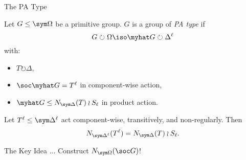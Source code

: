 \begin{frame}{The PA Type}
    \begin{defn}
        Let $G \leq \sym \Omega$ be a primitive group.
        $G$ is a group of \emph{PA type} if
        \\[-0.5em]
        \pause
        \[
        G \circlearrowright \Omega
        \iso
        \myhat G \circlearrowright \Delta ^
        \ell
        \]
        with:
        \vspace{-0.5em}
        \pause
        \begin{itemize}
            \item
            $T \circlearrowright \Delta$,
            \pause
            \item
            $\soc \myhat G = T ^ \ell$ in component-wise action,
            \pause
            \item
            $\myhat G \leq N_{\sym \Delta}(T) \wr S_\ell$ in product action.
        \end{itemize}
    \end{defn}
    \pause

    \begin{lemma}
        Let $T ^ \ell \leq \sym \Delta ^ \ell$ act component-wise,
        transitively, and non-regularly. Then
        \\[-1.0em]
        \pause
        \[
        N_{\sym \Delta ^ \ell}( T ^ \ell ) = N_{\sym \Delta}(T) \wr S_\ell.
        \]
    \end{lemma}
\end{frame}


\begin{frame}{The Key Idea ...}
    \centering
    {\Large
    Construct $N_{\sym \Omega}(\soc G)$!
    }
\end{frame}

